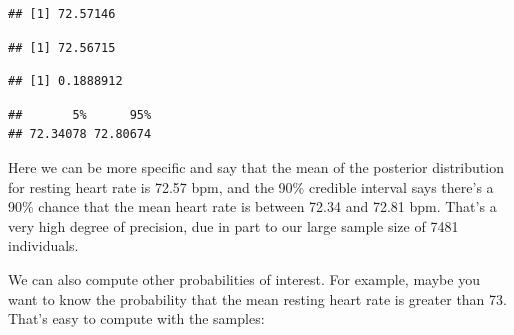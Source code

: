 \documentclass[
]{book}
\newenvironment{Shaded}{\begin{snugshade}}{\end{snugshade}}
\newcommand{\AttributeTok}[1]{\textcolor[rgb]{0.13,0.29,0.53}{#1}}
\newcommand{\CommentTok}[1]{\textcolor[rgb]{0.56,0.35,0.01}{\textit{#1}}}
\newcommand{\FloatTok}[1]{\textcolor[rgb]{0.00,0.00,0.81}{#1}}
\newcommand{\FunctionTok}[1]{\textcolor[rgb]{0.13,0.29,0.53}{\textbf{#1}}}
\newcommand{\NormalTok}[1]{#1}
\newcommand{\SpecialCharTok}[1]{\textcolor[rgb]{0.81,0.36,0.00}{\textbf{#1}}}
\begin{document}
\begin{verbatim}
## [1] 72.57146
\end{verbatim}

\begin{Shaded}
\end{Shaded}

\begin{verbatim}
## [1] 72.56715
\end{verbatim}

\begin{Shaded}
\end{Shaded}

\begin{verbatim}
## [1] 0.1888912
\end{verbatim}

\begin{Shaded}
\end{Shaded}

\begin{verbatim}
##       5%      95% 
## 72.34078 72.80674
\end{verbatim}

Here we can be more specific and say that the mean of the posterior distribution for resting heart rate is 72.57 bpm, and the 90\% credible interval says there's a 90\% chance that the mean heart rate is between 72.34 and 72.81 bpm. That's a very high degree of precision, due in part to our large sample size of 7481 individuals.

We can also compute other probabilities of interest. For example, maybe you want to know the probability that the mean resting heart rate is greater than 73. That's easy to compute with the samples:
\end{document}
